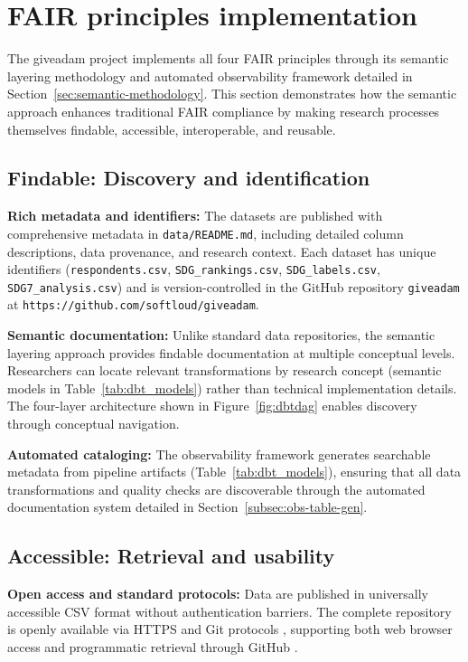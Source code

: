 \section{FAIR principles implementation}
\label{app:fair}

The giveadam project implements all four FAIR principles \cite{wilkinson2016fair} through its semantic layering methodology and automated observability framework detailed in Section~\ref{sec:semantic-methodology}. This section demonstrates how the semantic approach enhances traditional FAIR compliance by making research processes themselves findable, accessible, interoperable, and reusable.

\subsection{Findable: Discovery and identification}

\textbf{Rich metadata and identifiers:} The datasets are published with comprehensive metadata in \texttt{data/README.md}, including detailed column descriptions, data provenance, and research context. Each dataset has unique identifiers (\texttt{respondents.csv}, \texttt{SDG\_rankings.csv}, \texttt{SDG\_labels.csv}, \texttt{SDG7\_analysis.csv}) and is version-controlled in the GitHub repository \texttt{giveadam} at \texttt{https://github.com/softloud/giveadam}.

\textbf{Semantic documentation:} Unlike standard data repositories, the semantic layering approach provides findable documentation at multiple conceptual levels. Researchers can locate relevant transformations by research concept (semantic models in Table~\ref{tab:dbt_models}) rather than technical implementation details. The four-layer architecture shown in Figure~\ref{fig:dbtdag} enables discovery through conceptual navigation.

\textbf{Automated cataloging:} The observability framework generates searchable metadata from pipeline artifacts (Table~\ref{tab:dbt_models}), ensuring that all data transformations and quality checks are discoverable through the automated documentation system detailed in Section~\ref{subsec:obs-table-gen}.

\subsection{Accessible: Retrieval and usability}

\textbf{Open access and standard protocols:} Data are published in universally accessible CSV format \cite{csv_rfc} without authentication barriers. The complete repository is openly available via HTTPS and Git protocols \cite{git}, supporting both web browser access and programmatic retrieval through GitHub \cite{github}.

